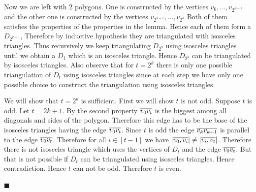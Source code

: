 \documentclass[a4paper, 11pt]{article}
\renewenvironment{proof}{\noindent{\it \textbf{Proof:}}\hspace*{1em}}{\hfill $\blacksquare$\bigskip\\}
\begin{document}
{\begin{itemize}[label=$\bullet$]
\begin{itemize}
\begin{proof}
	Now we are left with 2 polygons. One is constructed by the vertices $v_0,\dots, v_{2^{k-1}}$ and the other one is constructed by the vertices $v_{2^{k-1}}, \dots, v_{2^{k}}$ Both of them satisfies the properties of the properties in the lemma. Hence each of them form a $D_{2^{k-1}}$, Therefore by inductive hypothesis they are  triangulated with isosceles triangles. Thus recursively we keep triangulating $D_{2^k}$ using isosceles triangles until we obtain a $D_1$ which is an isosceles triangle. Hence $D_{2^k}$ can be triangulated by isosceles triangles. Also observe that for $t=2^k$ there is only one possible triangulation of $D_t$ using isosceles triangles since at each step we have only one possible choice to construct the triangulation using isosceles triangles.
	
	We will show that $t=2^k$ is sufficient. First we will show $t$ is not odd.  Suppose $t$ is odd. Let $t=2k+1$. By the second property $\overline{v_0v_t}$ is the biggest among all diagonals and sides of the polygon. Therefore this edge has to be  the base of the isosceles triangles having the edge $\overline{v_0v_t}$. Since $t$ is odd the edge $\overline{v_{k}v_{k+1}}$ is parallel to the edge $\overline{v_0v_t}$. Therefore for all $i\in [t-1]$ we have $|\overline{v_0,v_i}|\neq |\overline{v_i,v_t}|$. Therefore there is not isosceles triangle which uses the vertices of $D_t$ and the edge $\overline{v_0v_t}$. But that is not possible if $D_t$ can be triangulated using isosceles triangles. Hence contradiction. Hence $t$ can not be odd. Therefore $t$ is even.
	

\end{proof}
\end{itemize}
\end{itemize}}
\end{document}
